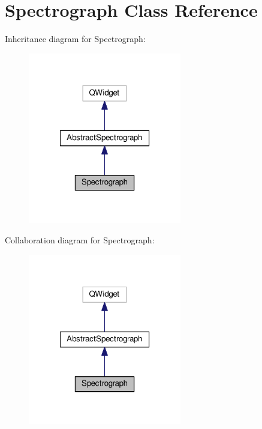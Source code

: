 \hypertarget{class_spectrograph}{\section{Spectrograph Class Reference}
\label{class_spectrograph}
}


Inheritance diagram for Spectrograph\-:
\nopagebreak
\begin{figure}[H]
\begin{center}
\leavevmode
\includegraphics[width=190pt]{class_spectrograph__inherit__graph}
\end{center}
\end{figure}


Collaboration diagram for Spectrograph\-:
\nopagebreak
\begin{figure}[H]
\begin{center}
\leavevmode
\includegraphics[width=190pt]{class_spectrograph__coll__graph}
\end{center}
\end{figure}
